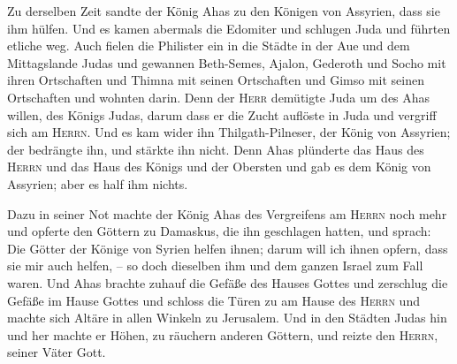  Zu derselben Zeit sandte der König Ahas zu den Königen
von Assyrien, dass sie ihm hülfen.  Und es kamen abermals
die Edomiter und schlugen Juda und führten etliche weg. 
Auch fielen die Philister ein in die Städte in der Aue und dem
Mittagslande Judas und gewannen Beth-Semes, Ajalon, Gederoth und Socho
mit ihren Ortschaften und Thimna mit seinen Ortschaften und Gimso mit
seinen Ortschaften und wohnten darin.  Denn der
\textsc{Herr} demütigte Juda um des Ahas willen, des Königs Judas, darum
dass er die Zucht auflöste in Juda und vergriff sich am \textsc{Herrn}.
 Und es kam wider ihn Thilgath-Pilneser, der König von
Assyrien; der bedrängte ihn, und stärkte ihn nicht.  Denn
Ahas plünderte das Haus des \textsc{Herrn} und das Haus des Königs und
der Obersten und gab es dem König von Assyrien; aber es half ihm nichts.

 Dazu in seiner Not machte der König Ahas des Vergreifens
am \textsc{Herrn} noch mehr  und opferte den Göttern zu
Damaskus, die ihn geschlagen hatten, und sprach: Die Götter der Könige
von Syrien helfen ihnen; darum will ich ihnen opfern, dass sie mir auch
helfen, -- so doch dieselben ihm und dem ganzen Israel zum Fall waren.
 Und Ahas brachte zuhauf die Gefäße des Hauses Gottes und
zerschlug die Gefäße im Hause Gottes und schloss die Türen zu am Hause
des \textsc{Herrn} und machte sich Altäre in allen Winkeln zu Jerusalem.
 Und in den Städten Judas hin und her machte er Höhen, zu
räuchern anderen Göttern, und reizte den \textsc{Herrn}, seiner Väter
Gott.


